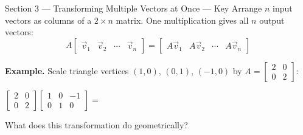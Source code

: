 \documentclass[10pt]{article}
\begin{document}
\vspace{0.08in}

\begin{notesbox}{Section 3 --- Transforming Multiple Vectors at Once --- Key}
\small
Arrange $n$ input vectors as columns of a $2\times n$ matrix.
One multiplication gives all $n$ output vectors:
\[
  A\begin{bmatrix}\vec{v}_1 & \vec{v}_2 & \cdots & \vec{v}_n\end{bmatrix}
  = \begin{bmatrix}A\vec{v}_1 & A\vec{v}_2 & \cdots & A\vec{v}_n\end{bmatrix}
\]

\textbf{Example.}  Scale triangle vertices $(1,0)$, $(0,1)$, $(-1,0)$ by
$A = \begin{bmatrix}2&0\\0&2\end{bmatrix}$:

\vspace{0.06in}
$\begin{bmatrix}2&0\\0&2\end{bmatrix}
\begin{bmatrix}1 & 0 & -1\\ 0 & 1 & 0\end{bmatrix}
= $ 

\vspace{0.08in}
What does this transformation do geometrically?
\end{notesbox}

\vspace{0.08in}
\end{document}
